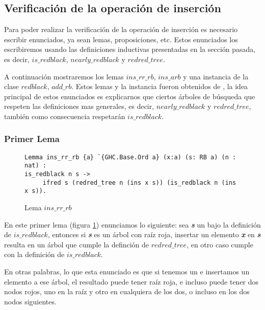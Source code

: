 \subsection{Verificación de la operación de inserción}

Para poder realizar la verificaci\'on de la operaci\'on de inserci\'on es necesario escribir
enunciados, ya sean lemas, proposiciones, etc. Estos enunciados los escribiremos usando las 
definiciones inductivas presentadas en la secci\'on pasada, es decir, 
\hyperref[inductive_isRedB]{$is\_redblack$}, \hyperref[inductive_isRedB]{$nearly\_redblack$} y 
\hyperref[inductive_isRedB]{$redred\_tree$}.

A continuaci\'on mostraremos los lemas \hyperref[lema_1]{$ins\_rr\_rb$}, 
\hyperref[lema_2]{$ins\_arb$} y una instancia \cite{classes} de la clase 
\hyperref[class_rb]{$redblack$}, $add\_rb$. Estos lemas y la instancia fueron obtenidos de 
\cite{MSetRBT}, la idea principal de estos enunciados es explicarnos que ciertos \'arboles de 
b\'usqueda que respeten las definiciones mas generales, es decir, 
\hyperref[inductive_isRedB]{$nearly\_redblack$} y \hyperref[inductive_isRedB]{$redred\_tree$}, 
también como consecuencia respetar\'an \hyperref[inductive_isRedB]{$is\_redblack$}.

\subsubsection{Primer Lema}

\begin{figure}[!ht]
\centering
\captionsetup{justification=centering}
\begin{verbatim}
Lemma ins_rr_rb {a} `{GHC.Base.Ord a} (x:a) (s: RB a) (n : nat) :
is_redblack n s ->
     ifred s (redred_tree n (ins x s)) (is_redblack n (ins x s)).
\end{verbatim}
\caption{Lema $ins\_rr\_rb$}
\label{lema_1}
\end{figure}

En este primer lema (figura \ref{lema_1}) enunciamos lo siguiente: sea \textit{\textbf{s}} un {\arn} 
bajo la definici\'on de \hyperref[inductive_isRedB]{$is\_redblack$}, entonces si \textit{\textbf{s}} 
es un \'arbol con raíz roja, insertar un elemento \textit{\textbf{x}} en \textit{\textbf{s}} resulta 
en un \'arbol que cumple la definci\'on de \hyperref[inductive_isRedB]{$redred\_tree$}, en otro caso 
cumple con la definici\'on de \hyperref[inductive_isRedB]{$is\_redblack$}.

En otras palabras, lo que esta enunciado es que si tenemos un {\arn} e insertamos
un elemento a ese \'arbol, el resultado puede tener ra\'iz roja, e incluso puede tener dos nodos
rojos, uno en la ra\'iz y otro en cualquiera de los dos, o incluso en los dos nodos siguientes.

